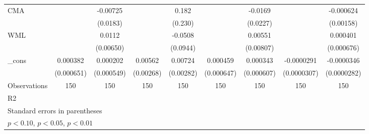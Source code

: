 {\begin{tabular}{l*{8}{c}}
CMA                 &                     &    -0.00725         &                     &       0.182         &                     &     -0.0169         &                     &   -0.000624         \\
                    &                     &    (0.0183)         &                     &     (0.230)         &                     &    (0.0227)         &                     &   (0.00158)         \\
WML                 &                     &      0.0112\sym{*}  &                     &     -0.0508         &                     &     0.00551         &                     &    0.000401         \\
                    &                     &   (0.00650)         &                     &    (0.0944)         &                     &   (0.00807)         &                     &  (0.000676)         \\
\_cons              &    0.000382         &    0.000202         &     0.00562\sym{**} &     0.00724\sym{**} &    0.000459         &    0.000343         &  -0.0000291         &  -0.0000346         \\
                    &  (0.000651)         &  (0.000549)         &   (0.00268)         &   (0.00282)         &  (0.000647)         &  (0.000607)         & (0.0000307)         & (0.0000282)         \\
\hline
Observations        &         150         &         150         &         150         &         150         &         150         &         150         &         150         &         150         \\
R2                  &                     &                     &                     &                     &                     &                     &                     &                     \\
\hline\hline
\multicolumn{9}{l}{\footnotesize Standard errors in parentheses}\\
\multicolumn{9}{l}{\footnotesize \sym{*} \(p<0.10\), \sym{**} \(p<0.05\), \sym{***} \(p<0.01\)}\\
\end{tabular}
}
